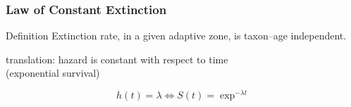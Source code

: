 \documentclass{beamer}
\begin{document}
\begin{frame}
  \frametitle{Law of Constant Extinction}

  \begin{alertblock}{Definition}
    Extinction rate, in a given adaptive zone, is taxon--age independent.

    \tiny{}
  \end{alertblock}

  \begin{center}
    translation: hazard is constant with respect to time \\(\alert{exponential survival})
  \end{center}

  \[
    h(t) = \lambda \iff S(t) = \exp^{-\lambda t}
  \]

\end{frame}
\end{document}
